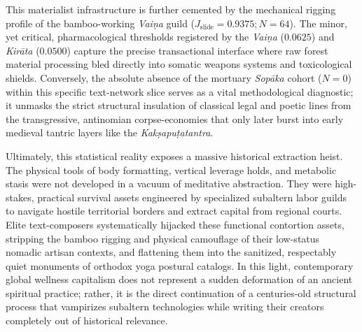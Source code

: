 \documentclass[11pt,twoside,letterpaper]{article}
\begin{document}
\begin{table}[ht]

\caption{Empirical Localized Jaccard Coefficients ($J_{\text{slide}}$) Across Subaltern Technical Cohorts}
\label{tab:real_jaccard_weights}
\end{table}

This materialist infrastructure is further cemented by the mechanical rigging profile of the bamboo-working \textit{Vaiṇa} guild ($J_{\text{slide}} = 0.9375; N = 64$). The minor, yet critical, pharmacological thresholds registered by the \textit{Vaiṇa} ($0.0625$) and \textit{Kirāta} ($0.0500$) capture the precise transactional interface where raw forest material processing bled directly into somatic weapons systems and toxicological shields. Conversely, the absolute absence of the mortuary \textit{Sopāka} cohort ($N = 0$) within this specific text-network slice serves as a vital methodological diagnostic; it unmasks the strict structural insulation of classical legal and poetic lines from the transgressive, antinomian corpse-economies that only later burst into early medieval tantric layers like the \textit{Kakṣapuṭatantra}.

Ultimately, this statistical reality exposes a massive historical extraction heist. The physical tools of body formatting, vertical leverage holds, and metabolic stasis were not developed in a vacuum of meditative abstraction. They were high-stakes, practical survival assets engineered by specialized subaltern labor guilds to navigate hostile territorial borders and extract capital from regional courts. Elite text-composers systematically hijacked these functional contortion assets, stripping the bamboo rigging and physical camouflage of their low-status nomadic artisan contexts, and flattening them into the sanitized, respectably quiet monuments of orthodox yoga postural catalogs. In this light, contemporary global wellness capitalism does not represent a sudden deformation of an ancient spiritual practice; rather, it is the direct continuation of a centuries-old structural process that vampirizes subaltern technologies while writing their creators completely out of historical relevance.
\end{document}
